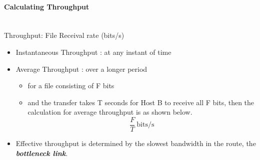\documentclass[a4paper]{article}
\begin{document}
\paragraph{Calculating Throughput}\mbox{}\\
Throughput: File Receival rate (bits/s)
\begin{itemize}
	\item Instantaneous Throughput : at any instant of time
	\item Average Throughput : over a longer period
	\begin{itemize}[label=$\circ$]
		\item for a file consisting of F bits
		\item and the transfer takes T seconds for Host B to receive all F bits, then the calculation for average throughput is as shown below. $$ \frac{F}{T} \ \text{bits/s}$$
	\end{itemize}
	\item Effective throughput is determined by the slowest bandwidth in the route, the \textbf{\textit{bottleneck link}}.
\end{itemize}
\end{document}
